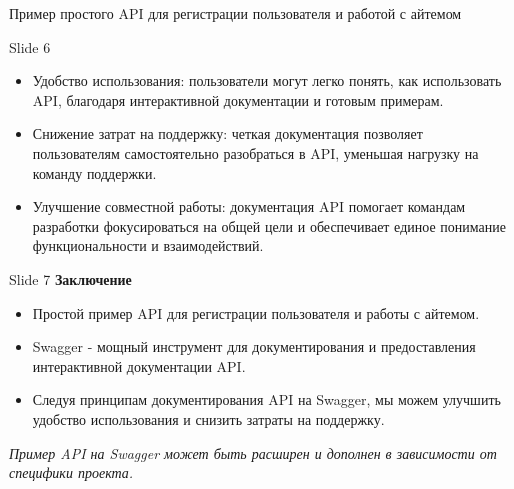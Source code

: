 \documentclass[
  ignorenonframetext,
  aspectratio=169,
  aspectratio=169]{beamer}
\providecommand{\tightlist}{%
  \setlength{\itemsep}{0pt}\setlength{\parskip}{0pt}}
\begin{document}
\begin{frame}[fragile]{Пример простого API для регистрации пользователя
и работой с айтемом}
\begin{block}{Slide 6}
\begin{itemize}
\tightlist
\item
  Удобство использования: пользователи могут легко понять, как
  использовать API, благодаря интерактивной документации и готовым
  примерам.
\item
  Снижение затрат на поддержку: четкая документация позволяет
  пользователям самостоятельно разобраться в API, уменьшая нагрузку на
  команду поддержки.
\item
  Улучшение совместной работы: документация API помогает командам
  разработки фокусироваться на общей цели и обеспечивает единое
  понимание функциональности и взаимодействий.
\end{itemize}
\end{block}

\begin{block}{Slide 7}
\protect\hypertarget{slide-7}{}
\textbf{Заключение}

\begin{itemize}
\tightlist
\item
  Простой пример API для регистрации пользователя и работы с айтемом.
\item
  Swagger - мощный инструмент для документирования и предоставления
  интерактивной документации API.
\item
  Следуя принципам документирования API на Swagger, мы можем улучшить
  удобство использования и снизить затраты на поддержку.
\end{itemize}

\emph{Пример API на Swagger может быть расширен и дополнен в зависимости
от специфики проекта.}
\end{block}
\end{frame}
\end{document}
